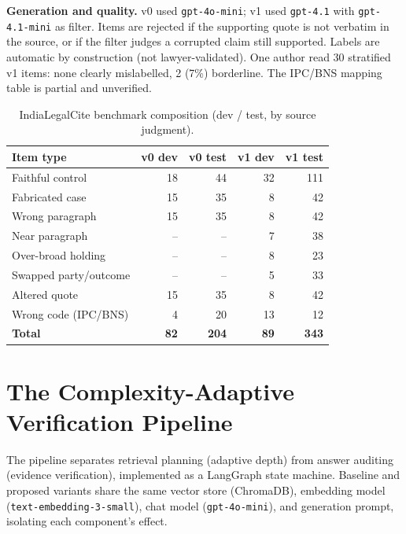 \documentclass[conference]{IEEEtran}
\begin{document}
\textbf{Generation and quality.} v0 used \texttt{gpt-4o-mini}; v1 used \texttt{gpt-4.1} with
\texttt{gpt-4.1-mini} as filter. Items are rejected if the supporting quote is not verbatim in
the source, or if the filter judges a corrupted claim still supported. Labels are automatic by
construction (not lawyer-validated). One author read 30 stratified v1 items: none clearly
mislabelled, 2 (7\%) borderline. The IPC/BNS mapping table is partial and unverified.

\begin{table}[t]
\centering
\caption{IndiaLegalCite benchmark composition (dev / test, by source judgment).}
\label{tab:composition}
\renewcommand{\arraystretch}{1.1}
\small
\begin{tabular}{lrrrr}
\toprule
\textbf{Item type} & \textbf{v0 dev} & \textbf{v0 test} & \textbf{v1 dev} & \textbf{v1 test} \\
\midrule
Faithful control      & 18 & 44  & 32 & 111 \\
Fabricated case       & 15 & 35  &  8 &  42 \\
Wrong paragraph       & 15 & 35  &  8 &  42 \\
Near paragraph        & -- & --  &  7 &  38 \\
Over-broad holding    & -- & --  &  8 &  23 \\
Swapped party/outcome & -- & --  &  5 &  33 \\
Altered quote         & 15 & 35  &  8 &  42 \\
Wrong code (IPC/BNS)  &  4 & 20  & 13 &  12 \\
\midrule
\textbf{Total}        & \textbf{82} & \textbf{204} & \textbf{89} & \textbf{343} \\
\bottomrule
\end{tabular}
\end{table}

\section{The Complexity-Adaptive Verification Pipeline}
\label{sec:pipeline}

The pipeline separates retrieval planning (adaptive depth) from answer auditing (evidence
verification), implemented as a LangGraph state machine. Baseline and proposed variants share the
same vector store (ChromaDB), embedding model (\texttt{text-embedding-3-small}), chat model
(\texttt{gpt-4o-mini}), and generation prompt, isolating each component's effect.
\end{document}
